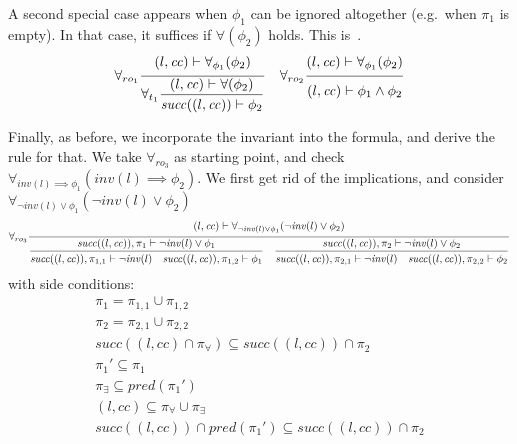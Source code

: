 \documentclass{article}
\newcommand{\proofrule}[3][]{#1 \frac{\raisebox{.7ex}{\normalsize{$#2$}}}
  {\raisebox{-1.0ex}{\normalsize{$#3$}}}}
\newcommand{\placeholder}[1][]{\pi_{#1}}
\newcommand{\loc}{l}
\newcommand{\region}{\mathit{cc}}
\newcommand{\suc}{\mathit{succ}}
\newcommand{\pre}{\mathit{pred}}
\newcommand{\inv}{\mathit{inv}}
\begin{document}
A second special case appears when $\phi_1$ can be ignored altogether (e.g.\ when $\placeholder[1]$ is empty). In that case, it suffices if $\forall(\phi_2)$ holds. This is~\cite[proof rule $\forall_{ro_1}$]{FC:14report}.
\[
\proofrule[\forall_{ro_1}]
{(\loc, \region) \vdash \forall_{\phi_1}(\phi_2)}
{ \proofrule[\forall_{t_1}]
  {(\loc, \region) \vdash \forall(\phi_2)}
  {\suc((\loc, \region)) \vdash \phi_2}
}
\quad
\proofrule[\forall_{ro_2}]
{(\loc, \region) \vdash \forall_{\phi_1}(\phi_2)}
{(\loc, \region) \vdash \phi_1 \land \phi_2}
\]

Finally, as before, we incorporate the invariant into the formula, and derive the rule for that.
We take $\forall_{ro_3}$ as starting point, and check $\forall_{\inv(\loc) \implies \phi_1}(\inv(\loc) \implies \phi_2)$. We first get rid of the implications, and consider $\forall_{\lnot \inv(\loc) \lor \phi_1}(\lnot \inv(\loc) \lor \phi_2)$
\[
\proofrule[\forall_{ro_3}]
{(\loc, \region) \vdash \forall_{\lnot \inv(\loc) \lor \phi_1}(\lnot \inv(\loc) \lor \phi_2)}
{ \proofrule
  {\suc((\loc, \region)), \placeholder[1] \vdash \lnot \inv(\loc) \lor \phi_1}
  {\suc((\loc, \region)), \placeholder[1,1] \vdash \lnot \inv(\loc)
   \quad \suc((\loc, \region)), \placeholder[1,2] \vdash \phi_1}
  \quad 
  \proofrule
  {\suc((\loc, \region)), \placeholder[2] \vdash \lnot \inv(\loc) \lor \phi_2}
  {\suc((\loc, \region)), \placeholder[2,1] \vdash \lnot \inv(\loc)
  \quad \suc((\loc, \region)), \placeholder[2,2] \vdash \phi_2}
}
\]
with side conditions:
\[
\begin{array}{l}
\placeholder[1] = \placeholder[1,1] \cup \placeholder[1,2]\\
\placeholder[2] = \placeholder[2,1] \cup \placeholder[2,2]\\
\suc((\loc, \region) \cap \placeholder[\forall]) \subseteq \suc((\loc, \region)) \cap \placeholder[2]\\
\placeholder[1]' \subseteq \placeholder[1]\\
\placeholder[\exists] \subseteq \pre(\placeholder[1]')\\
(\loc, \region) \subseteq \placeholder[\forall] \cup \placeholder[\exists]\\
\suc((\loc, \region)) \cap \pre(\placeholder[1]') \subseteq \suc((\loc, \region)) \cap \placeholder[2]
\end{array}
\]
\end{document}
